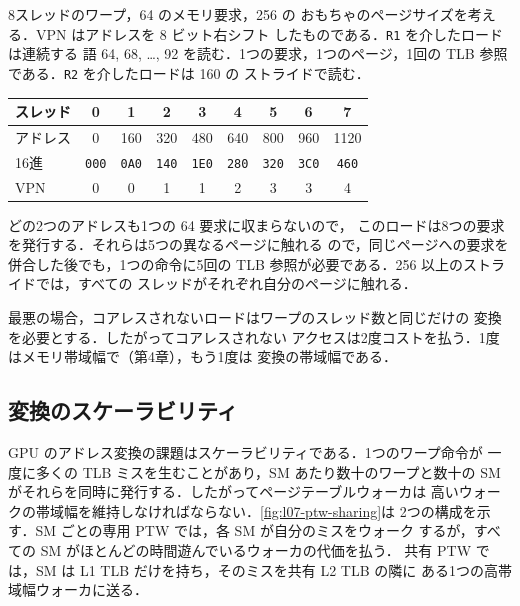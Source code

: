 \documentclass[../main.tex]{subfiles}
\begin{document}
\begin{example}
  \label{ex:l07-tlb-coalescing}
  8スレッドのワープ，\SI{64}{\byte} のメモリ要求，\SI{256}{\byte} の
  おもちゃのページサイズを考える．VPN はアドレスを 8 ビット右シフト
  したものである．\texttt{R1} を介したロードは連続する
  語 64, 68, \ldots, 92 を読む．1つの要求，1つのページ，1回の TLB
  参照である．\texttt{R2} を介したロードは \SI{160}{\byte} の
  ストライドで読む．
  \begin{center}
    \small
    \begin{tabular}{@{}lcccccccc@{}}
      \toprule
      スレッド & 0 & 1 & 2 & 3 & 4 & 5 & 6 & 7 \\
      \midrule
      アドレス & 0 & 160 & 320 & 480 & 640 & 800 & 960 & 1120 \\
      16進 & \texttt{000} & \texttt{0A0} & \texttt{140} & \texttt{1E0} & \texttt{280} & \texttt{320} & \texttt{3C0} & \texttt{460} \\
      VPN & 0 & 0 & 1 & 1 & 2 & 3 & 3 & 4 \\
      \bottomrule
    \end{tabular}
  \end{center}
  どの2つのアドレスも1つの \SI{64}{\byte} 要求に収まらないので，
  このロードは8つの要求を発行する．それらは5つの異なるページに触れる
  ので，同じページへの要求を併合した後でも，1つの命令に5回の TLB
  参照が必要である．\SI{256}{\byte} 以上のストライドでは，すべての
  スレッドがそれぞれ自分のページに触れる．
\end{example}

最悪の場合，コアレスされないロードはワープのスレッド数と同じだけの
変換を必要とする．したがってコアレスされない
アクセスは2度コストを払う．1度はメモリ帯域幅で（第4章），もう1度は
変換の帯域幅である．

\subsection{変換のスケーラビリティ}

GPU のアドレス変換の課題はスケーラビリティである．1つのワープ命令が
一度に多くの TLB ミスを生むことがあり，SM あたり数十のワープと数十の
SM がそれらを同時に発行する．したがってページテーブルウォーカは
高いウォークの帯域幅を維持しなければならない．\cref{fig:l07-ptw-sharing}は
2つの構成を示す．SM ごとの専用 PTW では，各 SM が自分のミスをウォーク
するが，すべての SM がほとんどの時間遊んでいるウォーカの代価を払う．
共有 PTW では，SM は L1 TLB だけを持ち，そのミスを共有 L2 TLB の隣に
ある1つの高帯域幅ウォーカに送る．
\end{document}

